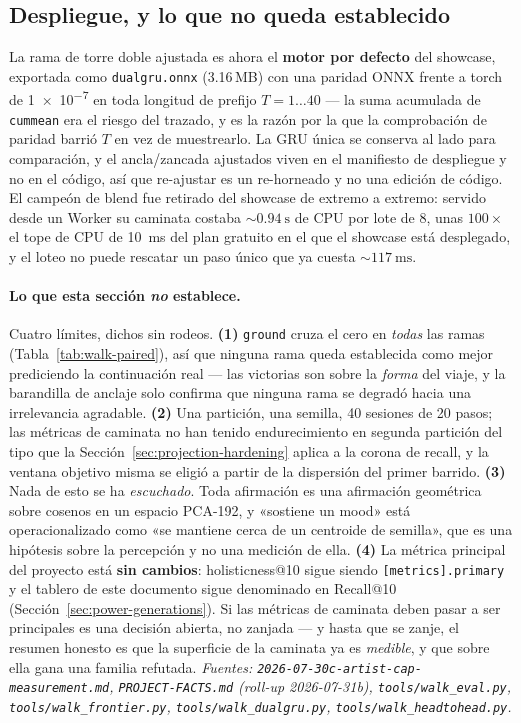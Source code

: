 \documentclass[11pt]{article}
\begin{document}
\subsection{Despliegue, y lo que no queda establecido}
\label{sec:walk-limits}
La rama de torre doble ajustada es ahora el \textbf{motor por defecto} del
showcase, exportada como \texttt{dualgru.onnx} (\num{3.16}\,MB) con una paridad
ONNX frente a torch de \num{1e-7} en toda longitud de prefijo $T = 1\ldots40$
--- la suma acumulada de \texttt{cummean} era el riesgo del trazado, y es la
razón por la que la comprobación de paridad barrió $T$ en vez de muestrearlo. La
GRU única se conserva al lado para comparación, y el ancla/zancada ajustados
viven en el manifiesto de despliegue y no en el código, así que re-ajustar es
un re-horneado y no una edición de código. El campeón de blend fue retirado del
showcase de extremo a extremo: servido desde un Worker su caminata costaba
${\sim}\SI{0.94}{\second}$ de CPU por lote de 8, unas $100\times$ el tope de CPU
de \SI{10}{\milli\second} del plan gratuito en el que el showcase está
desplegado, y el loteo no puede rescatar un paso único que ya cuesta
${\sim}\SI{117}{\milli\second}$.

\paragraph{Lo que esta sección \emph{no} establece.} Cuatro límites, dichos sin
rodeos. \textbf{(1)} \texttt{ground} cruza el cero en \emph{todas} las ramas
(Tabla~\ref{tab:walk-paired}), así que ninguna rama queda establecida como mejor
prediciendo la continuación real --- las victorias son sobre la \emph{forma} del
viaje, y la barandilla de anclaje solo confirma que ninguna rama se degradó
hacia una irrelevancia agradable. \textbf{(2)} Una partición, una semilla,
\num{40} sesiones de \num{20} pasos; las métricas de caminata no han tenido
endurecimiento en segunda partición del tipo que la
Sección~\ref{sec:projection-hardening} aplica a la corona de recall, y la ventana
objetivo misma se eligió a partir de la dispersión del primer barrido.
\textbf{(3)} Nada de esto se ha \emph{escuchado}. Toda afirmación es una
afirmación geométrica sobre cosenos en un espacio PCA-192, y «sostiene un mood»
está operacionalizado como «se mantiene cerca de un centroide de semilla», que
es una hipótesis sobre la percepción y no una medición de ella. \textbf{(4)} La
métrica principal del proyecto está \textbf{sin cambios}: holisticness@10 sigue
siendo \texttt{[metrics].primary} y el tablero de este documento sigue
denominado en Recall@10 (Sección~\ref{sec:power-generations}). Si las métricas de
caminata deben pasar a ser principales es una decisión abierta, no zanjada --- y
hasta que se zanje, el resumen honesto es que la superficie de la caminata ya es
\emph{medible}, y que sobre ella gana una familia refutada.
\emph{Fuentes: \texttt{2026-07-30c-artist-cap-measurement.md},
\texttt{PROJECT-FACTS.md} (roll-up 2026-07-31b),
\texttt{tools/walk\_eval.py}, \texttt{tools/walk\_frontier.py},
\texttt{tools/walk\_dualgru.py}, \texttt{tools/walk\_headtohead.py}.}
\end{document}
